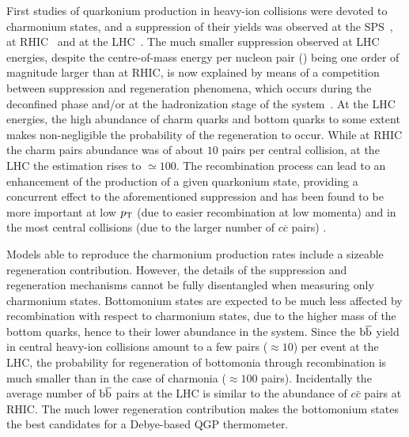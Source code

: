 First studies of quarkonium production in heavy-ion collisions were devoted to charmonium states, and a suppression of their yields was observed at the SPS~\cite{abreu:in2p3-00002434,Alessandro:2004ap,Arnaldi:2007zz}, at RHIC~\cite{Adare:2011yf,Abelev:2009qaa} and at the LHC~\cite{Abelev:2012rv,Chatrchyan:2012np,Adam:2016rdg}. 
The much smaller \jpsi suppression observed at LHC energies, despite the centre-of-mass energy per nucleon pair (\snn) being one order of magnitude larger than at RHIC, is now explained by means of a competition between suppression and regeneration phenomena, which occurs during the deconfined phase and/or at the hadronization stage of the system~\cite{BraunMunzinger:2000px,Thews:2000rj,Zhao:2011cv,Zhou:2014kka}.
At the LHC energies, the high abundance of charm quarks and bottom quarks to some extent makes non-negligible the probability of the regeneration to occur.
While at RHIC the charm pairs abundance was of about $10$ pairs per central collision, at the LHC the estimation rises to $\simeq100$.
The recombination process can lead to an enhancement of the production of a given quarkonium state, providing a concurrent effect to the aforementioned suppression and has been found to be more important at low $p_{\rm T}$ (due to easier recombination at low momenta) and in the most central collisions (due to the larger number of $c\overline{c}$ pairs) \cite{Abelev:2013ila,Adam:2015isa}.

Models able to reproduce the charmonium production rates include a sizeable regeneration contribution.
However, the details of the suppression and regeneration mechanisms cannot be fully disentangled when measuring only charmonium states.
Bottomonium states are expected to be much less affected by recombination with respect to charmonium states, due to the higher mass of the bottom quarks, hence to their lower abundance in the system.
Since the  ${\rm b{\overline b}}$ yield in central heavy-ion collisions amount to a few pairs ($\approx 10$) per event at the LHC, the probability for regeneration of bottomonia through recombination is much smaller than in the case of charmonia ($\approx 100$ pairs).
Incidentally the average number of ${\rm b{\overline b}}$ pairs at the LHC is similar to the abundance of $c\bar{c}$ pairs at RHIC.
The much lower regeneration contribution makes the bottomonium states the best candidates for a Debye-based QGP thermometer.

